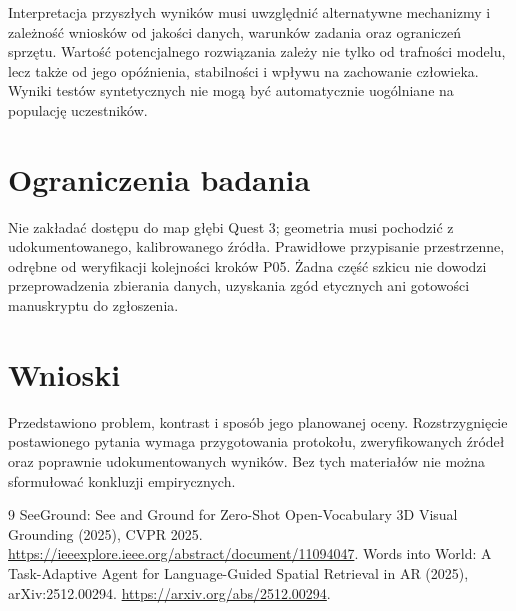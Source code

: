 \documentclass[11pt,a4paper]{article}
\begin{document}
Interpretacja przyszłych wyników musi uwzględnić alternatywne mechanizmy i zależność wniosków od jakości danych, warunków zadania oraz ograniczeń sprzętu. Wartość potencjalnego rozwiązania zależy nie tylko od trafności modelu, lecz także od jego opóźnienia, stabilności i wpływu na zachowanie człowieka. Wyniki testów syntetycznych nie mogą być automatycznie uogólniane na populację uczestników.

\section{Ograniczenia badania}

Nie zakładać dostępu do map głębi Quest 3; geometria musi pochodzić z udokumentowanego, kalibrowanego źródła. Prawidłowe przypisanie przestrzenne, odrębne od weryfikacji kolejności kroków P05. Żadna część szkicu nie dowodzi przeprowadzenia zbierania danych, uzyskania zgód etycznych ani gotowości manuskryptu do zgłoszenia.

\section{Wnioski}

Przedstawiono problem, kontrast i sposób jego planowanej oceny. Rozstrzygnięcie postawionego pytania wymaga przygotowania protokołu, zweryfikowanych źródeł oraz poprawnie udokumentowanych wyników. Bez tych materiałów nie można sformułować konkluzji empirycznych.

\begin{thebibliography}{9}
 SeeGround: See and Ground for Zero-Shot Open-Vocabulary 3D Visual Grounding (2025), CVPR 2025. \url{https://ieeexplore.ieee.org/abstract/document/11094047}.
 Words into World: A Task-Adaptive Agent for Language-Guided Spatial Retrieval in AR (2025), arXiv:2512.00294. \url{https://arxiv.org/abs/2512.00294}.
\end{thebibliography}
\end{document}
